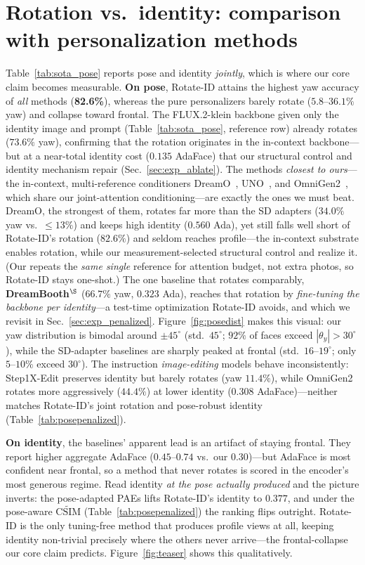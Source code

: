 \section{Rotation vs.\ identity: comparison with personalization methods}
Table~\ref{tab:sota_pose} reports pose and identity \emph{jointly}, which is
where our core claim becomes measurable. \textbf{On pose}, Rotate-ID attains the
highest yaw accuracy of \emph{all} methods (\textbf{82.6\%}), whereas the pure
personalizers barely rotate ($5.8\text{--}36.1\%$ yaw) and collapse toward
frontal. The FLUX.2-klein backbone given only the identity image and prompt
(Table~\ref{tab:sota_pose}, reference row) already rotates ($73.6\%$ yaw),
confirming that the rotation originates in the in-context backbone---but at a
near-total identity cost ($0.135$ AdaFace) that our structural control and
identity mechanism repair (Sec.~\ref{sec:exp_ablate}). The methods \emph{closest to ours}---the in-context, multi-reference
conditioners DreamO~\cite{dreamo}, UNO~\cite{uno}, and OmniGen2~\cite{omnigen2},
which share our joint-attention conditioning---are exactly the ones we must beat.
DreamO, the strongest of them, rotates far more
than the SD adapters ($34.0\%$ yaw vs.\ $\leq\!13\%$) and keeps high identity
($0.560$ Ada), yet still falls well short of Rotate-ID's rotation ($82.6\%$) and
seldom reaches profile---the in-context substrate enables rotation, while our
measurement-selected structural control and \gate{} realize it. (Our \dupid{}
repeats the \emph{same single} reference for attention budget, not extra photos, so
Rotate-ID stays one-shot.) The one baseline that rotates
comparably, \textbf{DreamBooth}$^\S$ ($66.7\%$ yaw, $0.323$ Ada), reaches that
rotation by \emph{fine-tuning the backbone per identity}---a test-time optimization
Rotate-ID avoids, and which we revisit in Sec.~\ref{sec:exp_penalized}.
Figure~\ref{fig:posedist} makes this visual: our yaw distribution is
bimodal around $\pm45^\circ$ (std.\ $45^\circ$; $92\%$ of faces exceed
$|{\theta_y}|{>}30^\circ$), while the SD-adapter baselines are sharply peaked at
frontal (std.\ $16\text{--}19^\circ$; only $5\text{--}10\%$ exceed $30^\circ$). The
instruction \emph{image-editing} models behave inconsistently: Step1X-Edit
preserves identity but barely rotates (yaw $11.4\%$), while OmniGen2 rotates more
aggressively ($44.4\%$) at lower identity ($0.308$ AdaFace)---neither matches
Rotate-ID's joint rotation and pose-robust identity (Table~\ref{tab:posepenalized}).

\textbf{On identity}, the baselines' apparent lead is an artifact of staying
frontal. They report higher aggregate AdaFace \csim{} ($0.45$--$0.74$ vs.\ our
$0.30$)---but AdaFace is most confident near frontal, so a method that never
rotates is scored in the encoder's most generous regime. Read identity \emph{at
the pose actually produced} and the picture inverts: the pose-adapted PAEs
lifts Rotate-ID's identity to $0.377$, and under the pose-aware
$\widetilde{\mathrm{CSIM}}$ (Table~\ref{tab:posepenalized}) the ranking flips
outright. Rotate-ID is the only tuning-free method that produces profile views
at all, keeping identity non-trivial precisely where the others never
arrive---the frontal-collapse our core claim predicts. Figure~\ref{fig:teaser}
shows this qualitatively.

